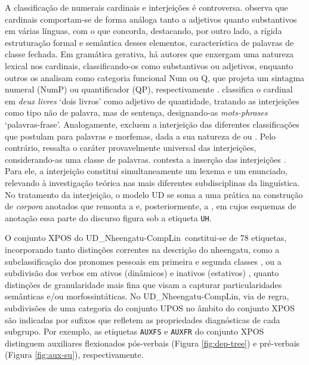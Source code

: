 \documentclass[portuguese]{textolivre}
\newcommand{\wt}[2]{\textit{#1} `#2'}
\newcommand{\tbc}{UD\_Nheengatu-CompLin}
\begin{document}
A classificação de numerais cardinais e interjeições é controversa. \textcite{greenberg2000numeral} observa que cardinais comportam-se de forma análoga tanto a adjetivos quanto substantivos em várias línguas, com o que \textcite{evans2000word} concorda, destacando, por outro lado, a rígida estruturação formal e semântica desses elementos, característica de palavras de classe fechada. Em gramática gerativa, há autores que enxergam uma natureza lexical nos cardinais, classificando-os como substantivos ou adjetivos, enquanto outros os analisam como categoria funcional Num ou Q, que projeta um sintagma numeral (NumP) ou quantificador (QP), respectivamente \parencite{ionin2018cardinals}. \textcite{tesniere1959elements} classifica o cardinal em \wt{deux livres}{dois livros} como adjetivo de quantidade, tratando as interjeições como tipo não de palavra, mas de sentença, designando-as \wt{mots-phrases}{palavras-frase}. Analogamente, \textcite[p. 92]{cunha2017} excluem a interjeição das diferentes classificações que postulam para palavras e morfemas, dada a sua natureza de  ou \parencite[605]{cunha2017}. Pelo contrário, \textcite{ameka1992interjections} ressalta o caráter provavelmente universal das interjeições, considerando-as uma classe de palavras. \textcite[p. 120]{wilkins1992interjections} contesta a inserção das interjeições . Para ele, a interjeição constitui simultaneamente um lexema e um enunciado, relevando à investigação teórica nas mais diferentes subdisciplinas da linguística. No tratamento da interjeição, o modelo UD se soma a uma prática na construção de \textit{corpora} anotados que remonta a \textcite{francis1979manual} e, posteriormente, a \textcite{santorini1990}, em cujos esquemas de anotação essa parte do discurso figura sob a etiqueta \texttt{UH}. 

O conjunto XPOS do \tbc~constitui-se de 78 etiquetas, incorporando tanto distinções correntes na descrição do nheengatu, como a subclassificação dos pronomes pessoais em primeira e segunda classes \parencite{navarro2016,avila2021}, ou a subdivisão dos verbos em ativos (dinâmicos) e inativos (estativos) \parencite{cruz2011}, quanto distinções de granularidade mais fina que visam a capturar particularidades semânticas e/ou morfossintáticas. No \tbc, via de regra, subdivisões de uma categoria do conjunto UPOS no âmbito do conjunto XPOS são indicadas por sufixos que refletem as propriedades diagnósticas de cada subgrupo. Por exemplo, as etiquetas \texttt{AUXFS} e \texttt{AUXFR} do conjunto XPOS distinguem auxiliares flexionados pós-verbais (Figura \ref{fig:dep-tree}) e pré-verbais (Figura \ref{fig:aux-su}), respectivamente.  
\end{document}
